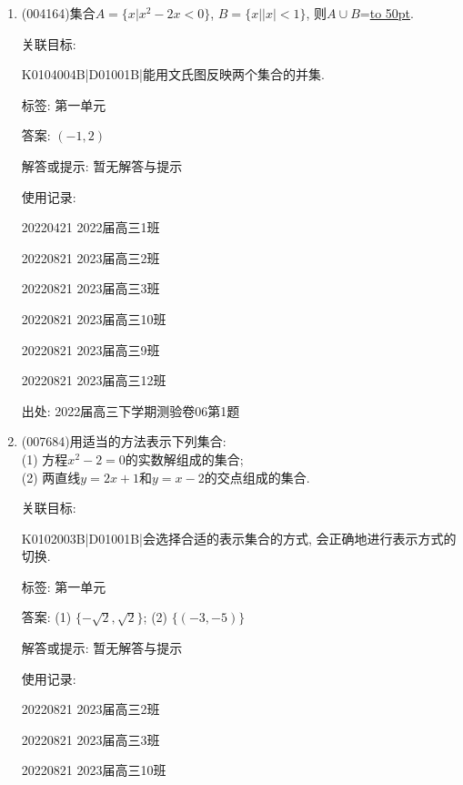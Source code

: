 \documentclass[10pt,a4paper]{article}
\newcommand{\blank}[1]{\underline{\hbox to #1pt{}}}
\begin{document}
\begin{enumerate}[1.]


\item{ (004164)}集合$A=\{x|x^2-2x<0\}$, $B=\{x||x|<1\}$, 则$A\cup B$=\blank{50}.


关联目标:

K0104004B|D01001B|能用文氏图反映两个集合的并集.



标签: 第一单元

答案: $(-1,2)$

解答或提示: 暂无解答与提示

使用记录:

20220421	2022届高三1班	

20220821	2023届高三2班	

20220821	2023届高三3班	

20220821	2023届高三10班	

20220821	2023届高三9班	

20220821	2023届高三12班	


出处: 2022届高三下学期测验卷06第1题
\newpage
\item{ (007684)}用适当的方法表示下列集合:\\
(1) 方程$x^2-2=0$的实数解组成的集合;\\
(2) 两直线$y=2x+1$和$y=x-2$的交点组成的集合.


关联目标:

K0102003B|D01001B|会选择合适的表示集合的方式, 会正确地进行表示方式的切换.



标签: 第一单元

答案: (1) $\{-\sqrt{2},\sqrt{2}\}$; (2) $\{(-3,-5)\}$

解答或提示: 暂无解答与提示

使用记录:

20220821	2023届高三2班		

20220821	2023届高三3班		

20220821	2023届高三10班		


\end{enumerate}
\end{document}
